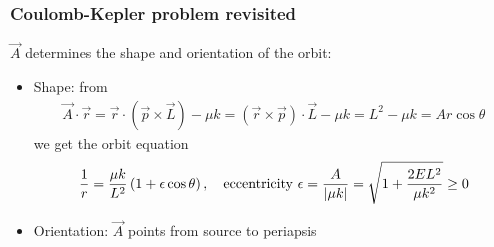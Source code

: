 \documentclass{beamer}
\theoremstyle{definition}
\newcommand{\lp}{\left(}
\newcommand{\rp}{\right)}
\newcommand{\f}[2]{\frac{#1}{#2}}
\begin{document}
\begin{frame}
\frametitle{Coulomb-Kepler problem revisited}
$\vec{A}$ determines the shape and orientation of the orbit:

\begin{itemize}

\item Shape: from
\begin{align*}
\vec{A} \cdot \vec{r} = \vec{r} \cdot (\vec{p} \times \vec{L}) - \mu k = (\vec{r}\times \vec{p})\cdot \vec{L} - \mu k = L^2 - \mu k  =  A r \cos\theta
\end{align*}
we get the orbit equation
\begin{align*}
\f{1}{r} = \f{\mu k }{L^2} \lp 1 + \epsilon \cos\theta \rp, \quad \text{eccentricity } \epsilon = \f{A}{\abs{\mu k}} = \sqrt{1 + \f{2EL^2}{\mu k^2}} \geq 0
\end{align*}

\item Orientation: $\vec{A}$ points from source to periapsis
\end{itemize}

\end{frame}
\end{document}
